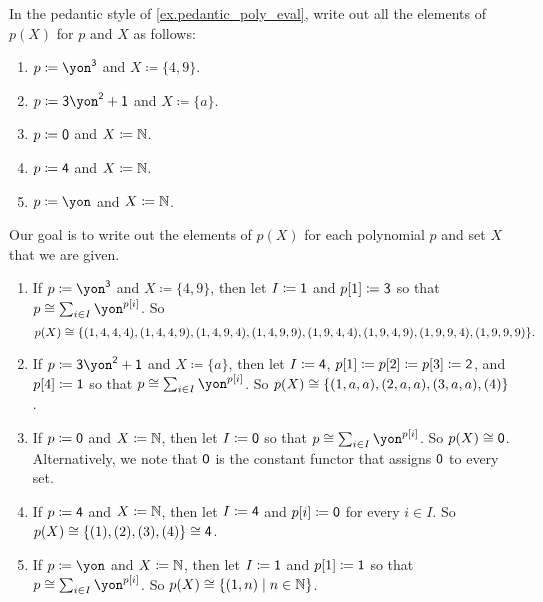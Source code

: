 \documentclass[Book-Poly]{subfiles}
\begin{document}
\begin{exercise}
In the pedantic style of \cref{ex.pedantic_poly_eval}, write out all the elements of $p(X)$ for $p$ and $X$ as follows:
\begin{enumerate}
	\item $p\coloneqq\yon^\3$ and $X\coloneqq\{4,9\}.$
	\item $p\coloneqq\3\yon^\2+\1$ and $X\coloneqq\{a\}$.
	\item $p\coloneqq\textsf{0}$ and $X\coloneqq\mathbb{N}$.
	\item $p\coloneqq\textsf{4}$ and $X\coloneqq\mathbb{N}$.
	\item $p\coloneqq\yon$ and $X\coloneqq\mathbb{N}$.
\qedhere
\end{enumerate}
\begin{solution}
Our goal is to write out the elements of $p(X)$ for each polynomial $p$ and set $X$ that we are given.
\begin{enumerate}
    \item If $p\coloneqq\yon^\3$ and $X\coloneqq\{4,9\}$, then let $I \coloneqq \textsf{1}$ and $p[1] \coloneqq \textsf{3}$ so that $p \iso \sum_{i \in I} \yon^{p[i]}$.
    So
    \[
        p(X) \cong \{(1, 4, 4, 4), (1, 4, 4, 9), (1, 4, 9, 4), (1, 4, 9, 9), (1, 9, 4, 4), (1, 9, 4, 9), (1, 9, 9, 4), (1, 9, 9, 9)\}.
    \]
    
    \item If $p\coloneqq\3\yon^\2+\1$ and $X\coloneqq\{a\}$, then let $I \coloneqq \textsf{4}$, $p[1] \coloneqq p[2] \coloneqq p[3] \coloneqq \textsf{2}$, and $p[4] \coloneqq \textsf{1}$ so that $p \iso \sum_{i \in I} \yon^{p[i]}$.
    So $p(X) \cong \{(1, a, a), (2, a, a), (3, a, a), (4)\}$.
	
	\item If $p\coloneqq\textsf{0}$ and $X\coloneqq\mathbb{N}$, then let $I \coloneqq \textsf{0}$ so that $p \iso \sum_{i \in I} \yon^{p[i]}$.
	So $p(X) \cong \textsf{0}$.
	Alternatively, we note that $\textsf{0}$ is the constant functor that assigns $\textsf{0}$ to every set. 
	
	\item If $p\coloneqq\textsf{4}$ and $X\coloneqq\mathbb{N}$, then let $I \coloneqq \textsf{4}$ and $p[i] \coloneqq \textsf{0}$ for every $i \in I$.
	So $p(X) \cong \{(1), (2), (3), (4)\} \cong \textsf{4}$.
	
	\item If $p\coloneqq\yon$ and $X\coloneqq\mathbb{N}$, then let $I \coloneqq \textsf{1}$ and $p[1] \coloneqq \textsf{1}$ so that $p \iso \sum_{i \in I} \yon^{p[i]}$.
    So $p(X) \cong \{(1, n) \mid n \in \mathbb{N}\}$.
\end{enumerate}
\end{solution}
\end{exercise}
\end{document}
